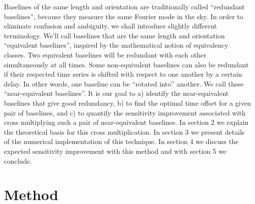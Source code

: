 \documentclass[preprint2,numberedappendix,tighten,twocolappendix]{aastex6}  %
\renewcommand\[{\begin{equation}}
\renewcommand\]{\end{equation}}
\begin{document}
Baselines of the same length and orientation are traditionally called
``redundant baselines'', because they measure the same Fourier mode
in the sky. In order to eliminate confusion and ambiguity, we shall
introduce slightly different terminology. We'll call baselines that
are the same length and orientation ``equivalent baselines'', inspired
by the mathematical notion of equivalency classes. Two equivalent
baselines will be redundant with each other simultaneously at all
times. Some non-equivalent baselines can also be redundant if their
respected time series is shifted with respect to one another by a
certain delay. In other words, one baseline can be ``rotated into''
another. We call these ``near-equivalent baselines''. It is our
goal to a) identify the near-equivalent baselines that give good
redundancy, b) to find the optimal time offset for a given pair of baselines, and
c) to quantify the sensitivity improvement associated with cross multiplying
such a pair of near-equivalent baselines. In section
2 we explain the theoretical basis for this cross multiplication.
In section 3 we present details of the numerical implementation of
this technique. In section 4 we discuss the expected sensitivity improvement
with this method and with section 5 we conclude. 


\section{Method}
\end{document}
